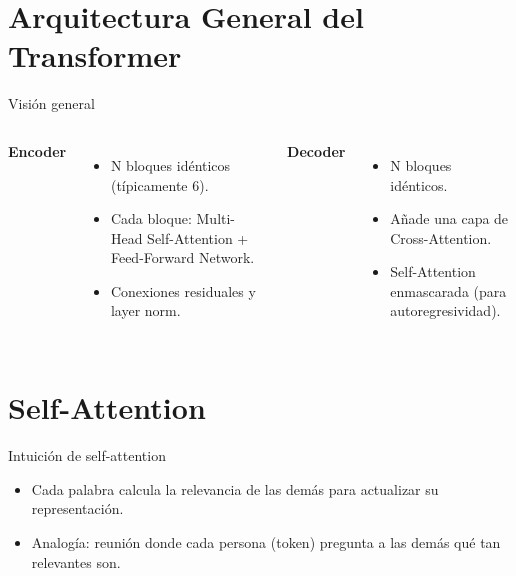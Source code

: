 \documentclass[aspectratio=169, 10pt, xcolor=table]{beamer}
\begin{document}
\section{Arquitectura General del Transformer}

\begin{frame}{Visión general}
    \begin{columns}[t]
        \textbf{Encoder}
        \begin{itemize}
            \item N bloques idénticos (típicamente 6).
            \item Cada bloque: Multi-Head Self-Attention + Feed-Forward Network.
            \item Conexiones residuales y layer norm.
        \end{itemize}
        \textbf{Decoder}
        \begin{itemize}
            \item N bloques idénticos.
            \item Añade una capa de Cross-Attention.
            \item Self-Attention enmascarada (para autoregresividad).
        \end{itemize}
    \end{columns}
\end{frame}

\section{Self-Attention}

\begin{frame}{Intuición de self-attention}
    \begin{itemize}
        \item Cada palabra calcula la relevancia de las demás para actualizar su representación.
        \item Analogía: reunión donde cada persona (token) pregunta a las demás qué tan relevantes son.
    \end{itemize}
\end{frame}
\end{document}
